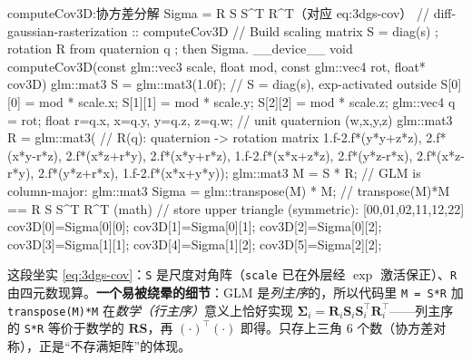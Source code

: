 \begin{codebox}[C++]{computeCov3D:协方差分解 Sigma = R S S\textasciicircum T R\textasciicircum T（对应 eq:3dgs-cov）}
// diff-gaussian-rasterization :: computeCov3D
// Build scaling matrix S = diag(s) ; rotation R from quaternion q ; then Sigma.
__device__ void computeCov3D(const glm::vec3 scale, float mod,
                             const glm::vec4 rot, float* cov3D) {
    glm::mat3 S = glm::mat3(1.0f);                 // S = diag(s), exp-activated outside
    S[0][0] = mod * scale.x;  S[1][1] = mod * scale.y;  S[2][2] = mod * scale.z;
    glm::vec4 q = rot;  float r=q.x, x=q.y, y=q.z, z=q.w;   // unit quaternion (w,x,y,z)
    glm::mat3 R = glm::mat3(                        // R(q): quaternion -> rotation matrix
        1.f-2.f*(y*y+z*z), 2.f*(x*y-r*z),     2.f*(x*z+r*y),
        2.f*(x*y+r*z),     1.f-2.f*(x*x+z*z), 2.f*(y*z-r*x),
        2.f*(x*z-r*y),     2.f*(y*z+r*x),     1.f-2.f*(x*x+y*y));
    glm::mat3 M = S * R;                            // GLM is column-major:
    glm::mat3 Sigma = glm::transpose(M) * M;        //  transpose(M)*M  ==  R S S^T R^T (math)
    // store upper triangle (symmetric): [00,01,02,11,12,22]
    cov3D[0]=Sigma[0][0]; cov3D[1]=Sigma[0][1]; cov3D[2]=Sigma[0][2];
    cov3D[3]=Sigma[1][1]; cov3D[4]=Sigma[1][2]; cov3D[5]=Sigma[2][2];
}
\end{codebox}

\noindent{}这段坐实 \cref{eq:3dgs-cov}：\texttt{S} 是尺度对角阵（\texttt{scale} 已在外层经 $\exp$ 激活保正）、\texttt{R} 由四元数现算。\textbf{一个易被绕晕的细节}：GLM 是\emph{列主序}的，所以代码里 \texttt{M = S*R} 加 \texttt{transpose(M)*M} 在\emph{数学（行主序）}意义上恰好实现 $\boldsymbol\Sigma_i=\mathbf R_i\mathbf S_i\mathbf S_i^\top\mathbf R_i^\top$——列主序的 \texttt{S*R} 等价于数学的 $\mathbf R\mathbf S$，再 $(\cdot)^\top(\cdot)$ 即得。只存上三角 $6$ 个数（协方差对称），正是“不存满矩阵”的体现。

